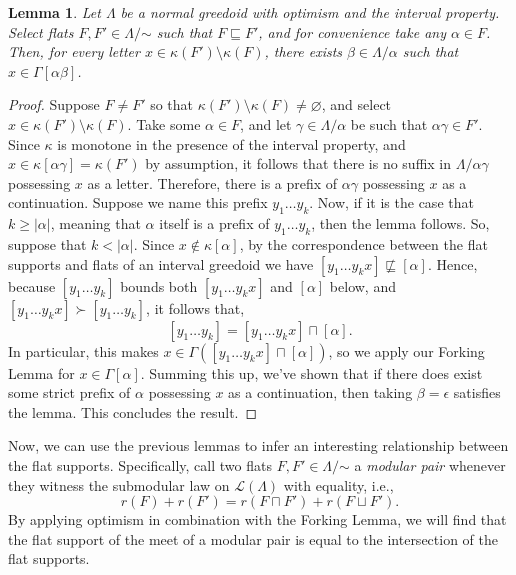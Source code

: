 \documentclass[11pt]{article}
\newtheorem{lemma}[theorem]{Lemma}
\newcommand{\glang}{\Lambda}
\providecommand{\L}{}
\renewcommand{\L}{\mathscr{L}}
\begin{document}
\iffalse
\begin{lemma}\label{lem:k-diff-cont}
    Let $\glang$ be a normal greedoid with optimism and the interval property.
    Select flats $F,F'\in\glang/\mathord{\sim}$ such that $F\sqsubseteq F'$, and for convenience take any $\alpha \in F$.
    Then, for every letter $x \in \kappa(F')\setminus \kappa(F)$, there exists $\beta \in \glang/\alpha$ such that $x \in \Gamma[\alpha\beta]$.
\end{lemma}
\begin{proof}
    Suppose $F \neq F'$ so that $\kappa(F')\setminus\kappa(F) \neq \varnothing$, and select $x \in \kappa(F')\setminus\kappa(F)$.
    Take some $\alpha \in F$, and let $\gamma \in \glang/\alpha$ be such that $\alpha\gamma \in F'$.
    Since $\kappa$ is monotone in the presence of the interval property, and $x \in \kappa[\alpha\gamma] = \kappa(F')$ by assumption, it follows that there is no suffix in $\glang/\alpha\gamma$ possessing $x$ as a letter.
    Therefore, there is a prefix of $\alpha\gamma$ possessing $x$ as a continuation.
    Suppose we name this prefix $y_1\ldots y_k$.
    Now, if it is the case that $k \geq |\alpha|$, meaning that $\alpha$ itself is a prefix of $y_1\ldots y_k$, then the lemma follows.
    So, suppose that $k < |\alpha|$.
    Since $x \notin \kappa[\alpha]$, by the correspondence between the flat supports and flats of an interval greedoid we have $[y_1\ldots y_k x] \not \sqsubseteq [\alpha]$.
    Hence, because $[y_1\ldots y_k]$ bounds both $[y_1\ldots y_k x]$ and $[\alpha]$ below, and $[y_1\ldots y_k x] \succ [y_1\ldots y_k]$, it follows that,
    $$[y_1 \ldots y_k] = [y_1\ldots y_k x]\sqcap [\alpha].$$
    In particular, this makes $x \in \Gamma([y_1\ldots y_k x] \sqcap [\alpha])$, so we apply our Forking Lemma for $x \in \Gamma[\alpha]$.
    Summing this up, we've shown that if there does exist some strict prefix of $\alpha$ possessing $x$ as a continuation, then taking $\beta = \epsilon$ satisfies the lemma.
    This concludes the result.
\end{proof}

Now, we can use the previous lemmas to infer an interesting relationship between the flat supports.
Specifically, call two flats $F,F'\in\glang/\mathord{\sim}$ a \emph{modular pair} whenever they witness the submodular law on $\L(\glang)$ with equality, i.e.,
\[
    r(F) + r(F') = r(F\sqcap F') + r(F\sqcup F').
\]
By applying optimism in combination with the Forking Lemma, we will find that the flat support of the meet of a modular pair is equal to the intersection of the flat supports.
\end{document}
